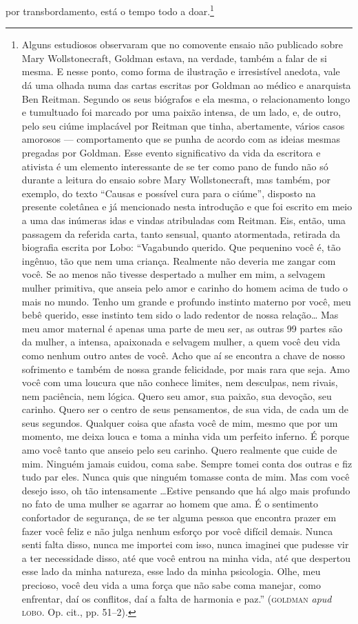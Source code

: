 por transbordamento, está o tempo todo a doar.\footnote{Alguns
  estudiosos observaram que no comovente ensaio não publicado sobre Mary
  Wollstonecraft, Goldman estava, na verdade, também a falar de si
  mesma. E nesse ponto, como forma de ilustração e irresistível anedota,
  vale dá uma olhada numa das cartas escritas por Goldman ao médico e
  anarquista Ben Reitman. Segundo os seus biógrafos e ela mesma, o
  relacionamento longo e tumultuado foi marcado por uma paixão intensa,
  de um lado, e, de outro, pelo seu ciúme implacável por Reitman que
  tinha, abertamente, vários casos amorosos --- comportamento que se
  punha de acordo com as ideias mesmas pregadas por Goldman. Esse evento
  significativo da vida da escritora e ativista é um elemento
  interessante de se ter como pano de fundo não só durante a leitura do
  ensaio sobre Mary Wollstonecraft, mas também, por exemplo, do texto
  ``Causas e possível cura para o ciúme'', disposto na presente
  coletânea e já mencionado nesta introdução e que foi escrito em meio a
  uma das inúmeras idas e vindas atribuladas com Reitman. Eis, então,
  uma passagem da referida carta, tanto sensual, quanto atormentada,
  retirada da biografia escrita por Lobo: ``Vagabundo querido. Que
  pequenino você é, tão ingênuo, tão que nem uma criança. Realmente não
  deveria me zangar com você. Se ao menos não tivesse despertado a
  mulher em mim, a selvagem mulher primitiva, que anseia pelo amor e
  carinho do homem acima de tudo o mais no mundo. Tenho um grande e
  profundo instinto materno por você, meu bebê querido, esse instinto
  tem sido o lado redentor de nossa relação\ldots{} Mas meu amor maternal é
  apenas uma parte de meu ser, as outras 99 partes são da mulher, a
  intensa, apaixonada e selvagem mulher, a quem você deu vida como
  nenhum outro antes de você. Acho que aí se encontra a chave de nosso
  sofrimento e também de nossa grande felicidade, por mais rara que
  seja. Amo você com uma loucura que não conhece limites, nem desculpas,
  nem rivais, nem paciência, nem lógica. Quero seu amor, sua paixão, sua
  devoção, seu carinho. Quero ser o centro de seus pensamentos, de sua
  vida, de cada um de seus segundos. Qualquer coisa que afasta você de
  mim, mesmo que por um momento, me deixa louca e toma a minha vida um
  perfeito inferno. É porque amo você tanto que anseio pelo seu carinho.
  Quero realmente que cuide de mim. Ninguém jamais cuidou, coma sabe.
  Sempre tomei conta dos outras e fiz tudo par eles. Nunca quis que
  ninguém tomasse conta de mim. Mas com você desejo isso, oh tão
  intensamente \ldots Estive pensando que há algo mais profundo no fato de
  uma mulher se agarrar ao homem que ama. É o sentimento confortador de
  segurança, de se ter alguma pessoa que encontra prazer em fazer você
  feliz e não julga nenhum esforço por você difícil demais. Nunca senti
  falta disso, nunca me importei com isso, nunca imaginei que pudesse
  vir a ter necessidade disso, até que você entrou na minha vida, até
  que despertou esse lado da minha natureza, esse lado da minha
  psicologia. Olhe, meu precioso, você deu vida a uma força que não sabe
  coma manejar, como enfrentar, daí os conflitos, daí a falta de
  harmonia e paz.'' (\textsc{goldman} \emph{apud} \textsc{lobo}. Op. cit., pp. 51--2).}

